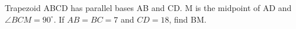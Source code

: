 Trapezoid ABCD has parallel bases AB and CD. M is the midpoint of AD and $\angle BCM=90^\circ$. If $AB=BC=7$ and $CD=18$, find BM.
